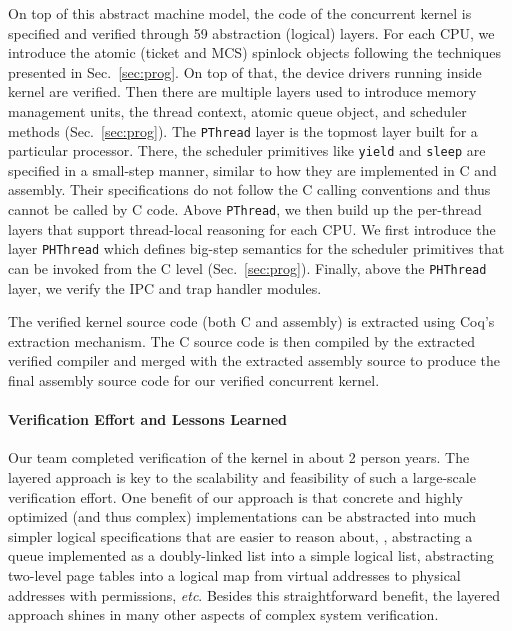 On top of this abstract machine model, the code of the concurrent kernel is specified and 
verified through 59 abstraction (logical) layers. For each CPU,
we introduce the atomic (ticket and MCS) spinlock objects following
the techniques presented in Sec.~\ref{sec:prog}.
On top of that, the device drivers running inside kernel are verified.
Then there are multiple layers used to introduce memory management units,
the thread context, atomic queue object, and scheduler methods (\cf Sec.~\ref{sec:prog}).
The \texttt{PThread} layer is the topmost layer built for a particular processor.
There, the scheduler primitives like \texttt{yield} and \texttt{sleep}
are specified in a small-step manner, similar to how they are implemented
in C and assembly. Their specifications do not follow the C calling conventions
and thus cannot be called by C code. Above \texttt{PThread}, we then build up the 
per-thread layers that support thread-local reasoning for each CPU.
We first introduce the layer \texttt{PHThread} which defines big-step semantics for
the scheduler primitives that can be invoked from the C level (\cf Sec.~\ref{sec:prog}).
Finally, above the \texttt{PHThread} layer, we verify the
IPC and trap handler modules.

The verified kernel source code (both C and assembly) is extracted using 
Coq's extraction mechanism. The C source code is then compiled by the
extracted verified compiler and merged with the extracted assembly source to
produce the final assembly source code for our verified concurrent kernel. 



\paragraph{Verification Effort and Lessons Learned}
Our team completed verification of the \cCTOS{} kernel in about 2 person years.
The layered approach is key to the scalability and feasibility of such a
large-scale verification effort.
One benefit of our approach is that
concrete and highly optimized (and thus complex) implementations can be abstracted
into much simpler logical specifications that are easier to reason about,
\eg, abstracting a queue implemented as a doubly-linked list into a simple logical list,
abstracting two-level page tables into a logical map from virtual addresses
to physical addresses with permissions, {\it etc}.
Besides this straightforward benefit, the layered approach shines in many other
aspects of complex system verification.

